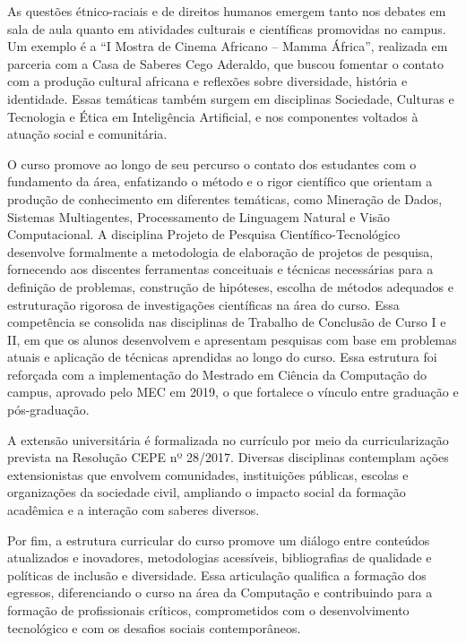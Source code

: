 As questões étnico-raciais e de direitos humanos emergem tanto nos debates em sala de aula quanto em atividades culturais e científicas promovidas no campus. Um exemplo é a “I Mostra de Cinema Africano – Mamma África”, realizada em parceria com a Casa de Saberes Cego Aderaldo, que buscou fomentar o contato com a produção cultural africana e reflexões sobre diversidade, história e identidade. Essas temáticas também surgem em disciplinas Sociedade, Culturas e Tecnologia e Ética em Inteligência Artificial, e nos componentes voltados à atuação social e comunitária.


O curso promove ao longo de seu percurso o contato dos estudantes com o fundamento da área, enfatizando o método e o rigor científico que orientam a produção de conhecimento em diferentes temáticas, como Mineração de Dados, Sistemas Multiagentes, Processamento de Linguagem Natural e Visão Computacional. A disciplina Projeto de Pesquisa Científico-Tecnológico desenvolve formalmente a metodologia de elaboração de projetos de pesquisa, fornecendo aos discentes ferramentas conceituais e técnicas necessárias para a definição de problemas, construção de hipóteses, escolha de métodos adequados e estruturação rigorosa de investigações científicas na área do curso. Essa competência se consolida nas disciplinas de Trabalho de Conclusão de Curso I e II, em que os alunos desenvolvem e apresentam pesquisas com base em problemas atuais e aplicação de técnicas aprendidas ao longo do curso. Essa estrutura foi reforçada com a implementação do Mestrado em Ciência da Computação do campus, aprovado pelo MEC em 2019, o que fortalece o vínculo entre graduação e pós-graduação.

A extensão universitária é formalizada no currículo por meio da curricularização prevista na Resolução CEPE nº 28/2017. Diversas disciplinas contemplam ações extensionistas que envolvem comunidades, instituições públicas, escolas e organizações da sociedade civil, ampliando o impacto social da formação acadêmica e a interação com saberes diversos.

Por fim, a estrutura curricular do curso promove um diálogo entre conteúdos atualizados e inovadores, metodologias acessíveis, bibliografias de qualidade e políticas de inclusão e diversidade. Essa articulação qualifica a formação dos egressos, diferenciando o curso na área da Computação e contribuindo para a formação de profissionais críticos, comprometidos com o desenvolvimento tecnológico e com os desafios sociais contemporâneos.


